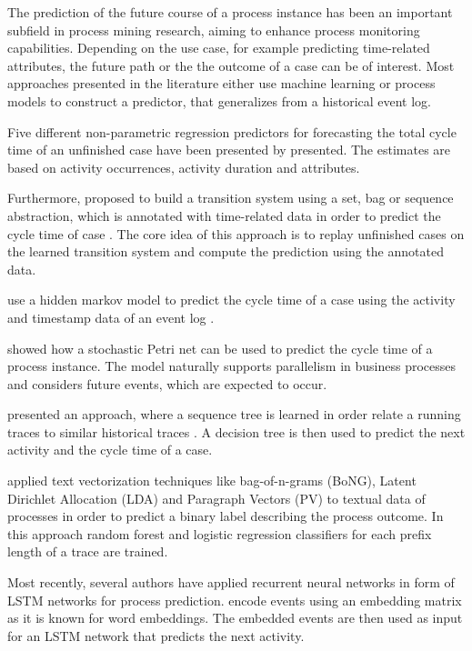 
The prediction of the future course of a process instance has been an important subfield in process mining research, aiming to enhance process monitoring capabilities.
Depending on the use case, for example predicting time-related attributes, the future path or the the outcome of a case can be of interest.
Most approaches presented in the literature either use machine learning or process models to construct a predictor, that generalizes from a historical event log.

Five different non-parametric regression predictors for forecasting the total cycle time of an unfinished case have been presented by  presented\cite{DBLP:conf/otm/DongenCA08}.
The estimates are based on activity occurrences, activity duration and attributes.

Furthermore,  proposed to build a transition system using a set, bag or sequence abstraction, which is annotated with time-related data in order to predict the cycle time of case \cite{DBLP:journals/is/AalstSS11}.
The core idea of this approach is to replay unfinished cases on the learned transition system and compute the prediction using the annotated data.

\citeauthor{DBLP:conf/colcom/PandeyNC11} use a hidden markov model to predict the cycle time of a case using the activity and timestamp data of an event log \cite{DBLP:conf/colcom/PandeyNC11}.

\citeauthor{DBLP:conf/icsoc/Rogge-SoltiW13} showed how a stochastic Petri net can be used to predict the cycle time of a process instance.
The model naturally supports parallelism in business processes and considers future events, which are expected to occur. 

\citeauthor{DBLP:conf/dis/CeciLFCM14} presented an approach, where a sequence tree is learned in order relate a running traces to similar historical traces \cite{DBLP:conf/dis/CeciLFCM14}.
A decision tree is then used to predict the next activity and the cycle time of a case.

\citeauthor{DBLP:conf/bpm/TeinemaaDMF16} applied text vectorization techniques like bag-of-n-grams (BoNG), Latent Dirichlet Allocation (LDA) and Paragraph Vectors (PV) to textual data of processes in order to predict a binary label describing the process outcome\cite{DBLP:conf/bpm/TeinemaaDMF16}.
In this approach random forest and logistic regression classifiers for each prefix length of a trace are trained.

Most recently, several authors have applied recurrent neural networks in form of LSTM networks for process prediction. \citeauthor{ DBLP:conf/bpm/EvermannRF16} encode events using an embedding matrix as it is known for word embeddings. The embedded events are then used as input for an LSTM network that predicts the next activity\cite{DBLP:conf/bpm/EvermannRF16}.


